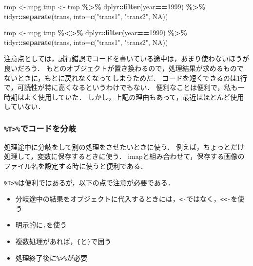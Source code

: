 \documentclass[
]{article}
\newenvironment{Shaded}{\begin{snugshade}}{\end{snugshade}}
\newcommand{\AttributeTok}[1]{\textcolor[rgb]{0.13,0.29,0.53}{#1}}
\newcommand{\ConstantTok}[1]{\textcolor[rgb]{0.56,0.35,0.01}{#1}}
\newcommand{\DecValTok}[1]{\textcolor[rgb]{0.00,0.00,0.81}{#1}}
\newcommand{\FunctionTok}[1]{\textcolor[rgb]{0.13,0.29,0.53}{\textbf{#1}}}
\newcommand{\NormalTok}[1]{#1}
\newcommand{\OtherTok}[1]{\textcolor[rgb]{0.56,0.35,0.01}{#1}}
\newcommand{\SpecialCharTok}[1]{\textcolor[rgb]{0.81,0.36,0.00}{\textbf{#1}}}
\newcommand{\StringTok}[1]{\textcolor[rgb]{0.31,0.60,0.02}{#1}}
\providecommand{\tightlist}{%
  \setlength{\itemsep}{0pt}\setlength{\parskip}{0pt}}
\begin{document}
\begin{Shaded}
\begin{Highlighting}[]
\NormalTok{tmp }\OtherTok{\textless{}{-}}\NormalTok{ mpg}
\NormalTok{tmp }\OtherTok{\textless{}{-}}
\NormalTok{  tmp }\SpecialCharTok{\%\textgreater{}\%}
\NormalTok{  dplyr}\SpecialCharTok{::}\FunctionTok{filter}\NormalTok{(year}\SpecialCharTok{==}\DecValTok{1999}\NormalTok{) }\SpecialCharTok{\%\textgreater{}\%}
\NormalTok{  tidyr}\SpecialCharTok{::}\FunctionTok{separate}\NormalTok{(trans, }\AttributeTok{into=}\FunctionTok{c}\NormalTok{(}\StringTok{"trans1"}\NormalTok{, }\StringTok{"trans2"}\NormalTok{, }\ConstantTok{NA}\NormalTok{))}

\NormalTok{tmp }\OtherTok{\textless{}{-}}\NormalTok{ mpg}
\NormalTok{tmp }\SpecialCharTok{\%\textless{}\textgreater{}\%}
\NormalTok{  dplyr}\SpecialCharTok{::}\FunctionTok{filter}\NormalTok{(year}\SpecialCharTok{==}\DecValTok{1999}\NormalTok{) }\SpecialCharTok{\%\textgreater{}\%}
\NormalTok{  tidyr}\SpecialCharTok{::}\FunctionTok{separate}\NormalTok{(trans, }\AttributeTok{into=}\FunctionTok{c}\NormalTok{(}\StringTok{"trans1"}\NormalTok{, }\StringTok{"trans2"}\NormalTok{, }\ConstantTok{NA}\NormalTok{))}
\end{Highlighting}
\end{Shaded}

注意点としては，試行錯誤でコードを書いている途中は，あまり使わないほうが良いだろう．
もとのオブジェクトが置き換わるので，処理結果が求めるものでないときに，もとに戻れなくなってしまうためだ．
コードを短くできるのは1行で，可読性が特に高くなるというわけでもない．
便利なことは便利で，私も一時期はよく使用していた．
しかし，上記の理由もあって，最近はほとんど使用していない．

\hypertarget{tux3067ux30b3ux30fcux30c9ux3092ux5206ux5c90}{%
\subsubsection{\texorpdfstring{\texttt{\%T\textgreater{}\%}でコードを分岐}{\%T\textgreater\%でコードを分岐}}\label{tux3067ux30b3ux30fcux30c9ux3092ux5206ux5c90}}

処理途中に分岐をして別の処理をさせたいときに使う．
例えば，ちょっとだけ処理して，変数に保存するときに使う．
imapと組み合わせて，保存する画像のファイル名を設定する時に使うと便利である．

\texttt{\%T\textgreater{}\%}は便利ではあるが，以下の点で注意が必要である．

\begin{itemize}
\tightlist
\item
  分岐途中の結果をオブジェクトに代入するときには，\texttt{\textless{}-}ではなく，\texttt{\textless{}\textless{}-}を使う\\
\item
  明示的に\texttt{.}を使う\\
\item
  複数処理があれば，\texttt{\{}と\texttt{\}}で囲う\\
\item
  処理終了後に\texttt{\%\textgreater{}\%}が必要
\end{itemize}
\end{document}
